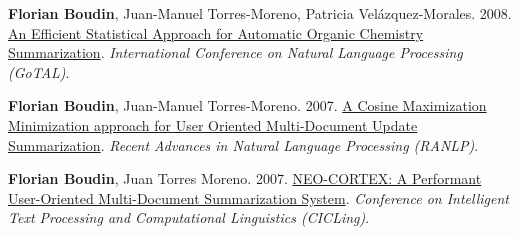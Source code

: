 \item 
\textbf{Florian Boudin}, Juan-Manuel Torres-Moreno, Patricia Velázquez-Morales.
2008.
\href{https://link.springer.com/content/pdf/10.1007/978-3-540-85287-2_9}{An Efficient Statistical Approach for Automatic Organic Chemistry Summarization}.
\textit{International Conference on Natural Language Processing (GoTAL)}.
\label{boudin-etal-2008-efficient}

\item 
\textbf{Florian Boudin}, Juan-Manuel Torres-Moreno.
2007.
\href{https://hal.science/hal-01313205}{A Cosine Maximization Minimization approach for User Oriented Multi-Document Update Summarization}.
\textit{Recent Advances in Natural Language Processing (RANLP)}.
\label{boudin-torres-moreno-2007-cosine}

\item 
\textbf{Florian Boudin}, Juan Torres Moreno.
2007.
\href{https://link.springer.com/chapter/10.1007/978-3-540-70939-8_49}{NEO-CORTEX: A Performant User-Oriented Multi-Document Summarization System}.
\textit{Conference on Intelligent Text Processing and Computational Linguistics (CICLing)}.
\label{boudin-torres-moreno-2007-neo}